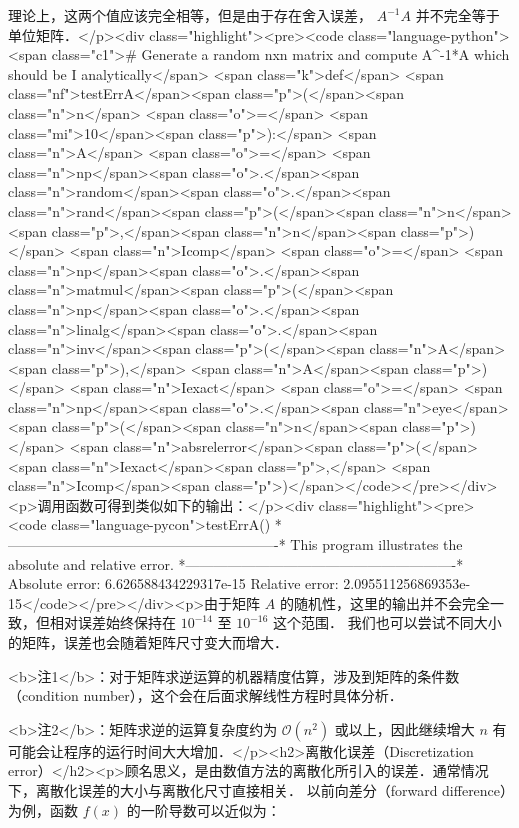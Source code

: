 理论上，这两个值应该完全相等，但是由于存在舍入误差， $A^{-1}A$ 并不完全等于单位矩阵．</p><div class="highlight"><pre><code class="language-python"><span class="c1"># Generate a random nxn matrix and compute A^{-1}*A which should be I analytically</span>
<span class="k">def</span> <span class="nf">testErrA</span><span class="p">(</span><span class="n">n</span> <span class="o">=</span> <span class="mi">10</span><span class="p">):</span>
    <span class="n">A</span> <span class="o">=</span> <span class="n">np</span><span class="o">.</span><span class="n">random</span><span class="o">.</span><span class="n">rand</span><span class="p">(</span><span class="n">n</span><span class="p">,</span><span class="n">n</span><span class="p">)</span>
    <span class="n">Icomp</span> <span class="o">=</span> <span class="n">np</span><span class="o">.</span><span class="n">matmul</span><span class="p">(</span><span class="n">np</span><span class="o">.</span><span class="n">linalg</span><span class="o">.</span><span class="n">inv</span><span class="p">(</span><span class="n">A</span><span class="p">),</span> <span class="n">A</span><span class="p">)</span>
    <span class="n">Iexact</span> <span class="o">=</span> <span class="n">np</span><span class="o">.</span><span class="n">eye</span><span class="p">(</span><span class="n">n</span><span class="p">)</span>
    <span class="n">absrelerror</span><span class="p">(</span><span class="n">Iexact</span><span class="p">,</span> <span class="n">Icomp</span><span class="p">)</span></code></pre></div><p>调用函数可得到类似如下的输出：</p><div class="highlight"><pre><code class="language-pycon">testErrA()
*----------------------------------------------------------*
This program illustrates the absolute and relative error.
*----------------------------------------------------------*
Absolute error: 6.626588434229317e-15
Relative error: 2.095511256869353e-15</code></pre></div><p>由于矩阵  $A$  的随机性，这里的输出并不会完全一致，但相对误差始终保持在 $10^{-14}$  至  $10^{-16}$  这个范围． 我们也可以尝试不同大小的矩阵，误差也会随着矩阵尺寸变大而增大．

<b>注1</b>：对于矩阵求逆运算的机器精度估算，涉及到矩阵的条件数（condition number），这个会在后面求解线性方程时具体分析．

<b>注2</b>：矩阵求逆的运算复杂度约为  $\mathcal{O}(n^2)$  或以上，因此继续增大  $n$  有可能会让程序的运行时间大大增加．</p><h2>离散化误差（Discretization error）</h2><p>顾名思义，是由数值方法的离散化所引入的误差．通常情况下，离散化误差的大小与离散化尺寸直接相关． 以前向差分（forward difference）为例，函数  $f(x)$  的一阶导数可以近似为：

